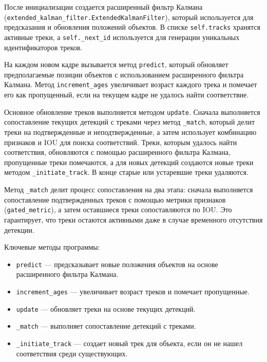 После инициализации создается расширенный фильтр Калмана (\lstinline:extended_kalman_filter.ExtendedKalmanFilter:), который используется для предсказания и обновления положений объектов. В списке \lstinline:self.tracks: хранятся активные треки, а \lstinline:self._next_id: используется для генерации уникальных идентификаторов треков.

На каждом новом кадре вызывается метод \lstinline:predict:, который обновляет предполагаемые позиции объектов с использованием расширенного фильтра Калмана. Метод \lstinline:increment_ages: увеличивает возраст каждого трека и помечает его как пропущенный, если на текущем кадре не удалось найти соответствие.

Основное обновление треков выполняется методом \lstinline:update:. Сначала выполняется сопоставление текущих детекций с треками через метод \lstinline:_match:, который делит треки на подтвержденные и неподтвержденные, а затем использует комбинацию признаков и IOU для поиска соответствий. Треки, которым удалось найти соответствия, обновляются с помощью расширенного фильтра Калмана, пропущенные треки помечаются, а для новых детекций создаются новые треки методом \lstinline:_initiate_track:. В конце старые или устаревшие треки удаляются.

Метод \lstinline:_match: делит процесс сопоставления на два этапа: сначала выполняется сопоставление подтвержденных треков с помощью метрики признаков (\lstinline:gated_metric:), а затем оставшиеся треки сопоставляются по IOU. Это гарантирует, что треки остаются активными даже в случае временного отсутствия детекции.

Ключевые методы программы:
\begin{itemize}
    \item \lstinline:predict: — предсказывает новые положения объектов на основе  расширенного фильтра Калмана.
    \item \lstinline:increment_ages: — увеличивает возраст треков и помечает пропущенные.
    \item \lstinline:update: — обновляет треки на основе текущих детекций.
    \item \lstinline:_match: — выполняет сопоставление детекций с треками.
    \item \lstinline:_initiate_track: — создает новый трек для объекта, если он не нашел соответствия среди существующих.
\end{itemize}

